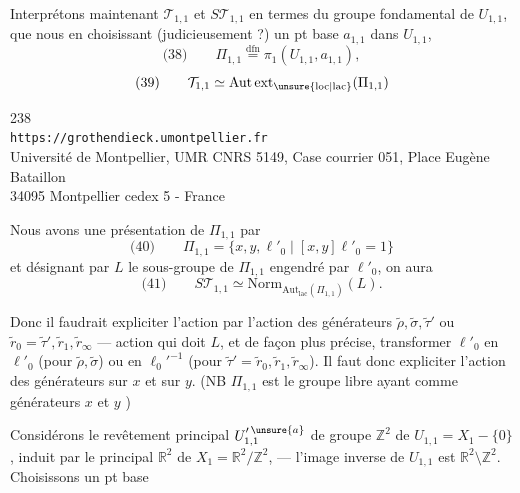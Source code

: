 Interprétons maintenant $\mathcal T_{1,1}$ et $S\mathcal T_{1,1}$ en termes du groupe fondamental de $U_{1,1}$, que nous  en choisissant (judicieusement ?) un pt base $a_{1,1}$ dans $U_{1,1}$,
\[
\text{(38)}\qquad
\Pi_{1,1}\overset{\mathrm{dfn}}=\pi_1(U_{1,1},a_{1,1}),
\]
\[
\text{(39)}\qquad
\mathcal T_{1,1}\simeq\mathrm{Aut\,ext}_{\unsure{\mathrm{loc}|\mathrm{lac}}}(\Pi_{1,1})
\]

\begin{center}
238\\
\texttt{https://grothendieck.umontpellier.fr}\\
Université de Montpellier, UMR CNRS 5149, Case courrier 051, Place Eugène Bataillon\\
34095 Montpellier cedex 5 - France
\end{center}


Nous avons une présentation de $\Pi_{1,1}$ par
\[
\text{(40)}\qquad
\Pi_{1,1}=\{x,y,\ell'_0\mid [x,y]\ell'_0=1\}
\]
et désignant par $L$ le sous-groupe de $\Pi_{1,1}$ engendré par $\ell'_0$, on aura
\[
\text{(41)}\qquad
S\mathcal T_{1,1}\simeq
\mathrm{Norm}_{\mathrm{Aut}_{\mathrm{lac}}(\Pi_{1,1})}(L).
\]

Donc il faudrait expliciter l'action
par l'action des générateurs $\widetilde\rho,\widetilde\sigma,\widetilde\tau'$ ou $\widetilde r_0=\widetilde\tau',\widetilde r_1,\widetilde r_\infty$ --- action qui doit  $L$, et de façon plus précise, transformer $\ell'_0$ en $\ell'_0$ (pour $\widetilde\rho,\widetilde\sigma$) ou en $\ell_0'^{-1}$ (pour $\widetilde\tau'=\widetilde r_0,\widetilde r_1,\widetilde r_\infty$). Il faut donc expliciter l'action des générateurs sur $x$ et sur $y$. (NB $\Pi_{1,1}$ est le groupe libre ayant comme générateurs $x$ et $y$ \unsure{!})

Considérons le revêtement principal $U_{1,1}^{\prime\,\unsure{a}}$ de groupe $\mathbb Z^2$ de $U_{1,1}=X_1-\{0\}$, induit par le  principal $\mathbb R^2$ de $X_1=\mathbb R^2/\mathbb Z^2$, --- l'image inverse de $U_{1,1}$ est $\mathbb R^2\setminus\mathbb Z^2$. Choisissons un pt base 

